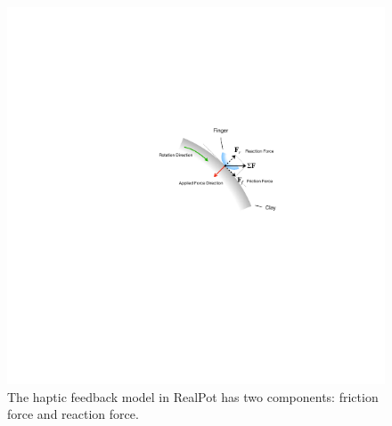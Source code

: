 \documentclass{svjour3}                     %
\begin{document}
\begin{figure}
\includegraphics[width=\textwidth]{fig15}
\caption{{\color{blue}The haptic feedback model in RealPot has two components: friction force and reaction force.}}
\label{fig:haptic}
\end{figure}
\end{document}
